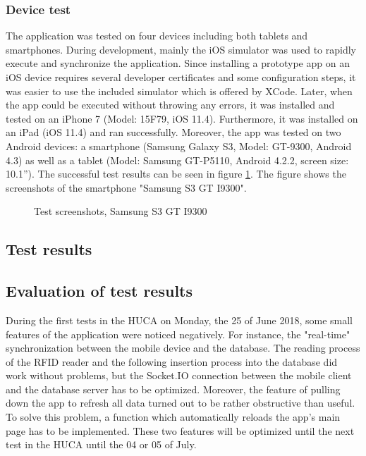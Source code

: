 \subsubsection{Device test}

The application was tested on four devices including both tablets and smartphones. During development, mainly the iOS simulator was used to rapidly execute and synchronize the application. Since installing a prototype app on an iOS device requires several developer certificates and some configuration steps, it was easier to use the included simulator which is offered by XCode. 
Later, when the app could be executed without throwing any errors, it was installed and tested on an iPhone 7 (Model: 15F79, iOS 11.4). Furthermore, it was installed on an iPad (iOS 11.4) and ran successfully. 
Moreover, the app was tested on two Android devices: a smartphone (Samsung Galaxy S3, Model: GT-9300, Android 4.3) as well as a tablet (Model: Samsung GT-P5110, Android 4.2.2, screen size: 10.1'').
The successful test results can be seen in figure \ref{fig:s3_screenshots}. The figure shows the screenshots of the smartphone "Samsung S3 GT I9300".

\begin{figure}
\centering
\subfigure{\texttt{[image: s3\_01]}}
\subfigure{\texttt{[image: s3\_02]}}
\subfigure{\texttt{[image: s3\_03]}}
\subfigure{\texttt{[image: s3\_04]}}
\caption{\label{fig:s3_screenshots} Test screenshots, Samsung S3 GT I9300}
\end{figure}

\subsection{Test results}

\subsection{Evaluation of test results}

During the first tests in the HUCA on Monday, the 25 of June 2018, some small features of the application were noticed negatively. For instance, the "real-time" synchronization between the mobile device and the database. The reading process of the RFID reader and the following insertion process into the database did work without problems, but the Socket.IO connection between the mobile client and the database server has to be optimized. Moreover, the feature of pulling down the app to refresh all data turned out to be rather obstructive than useful. To solve this problem, a function which automatically reloads the app's main page has to be implemented. These two features will be optimized until the next test in the HUCA until the 04 or 05 of July.

